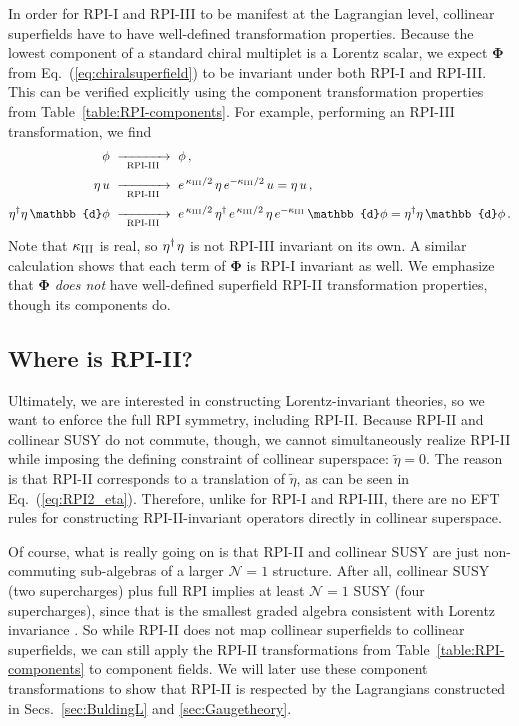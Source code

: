 \documentclass[12pt,document,nofootinbib,superscriptaddress,onecolumn,preprintnumbers,balancelastpage]{article}
\newcommand{\s}{\hspace{0.8pt}}
\newcommand{\PP}{\mathbb{d}}
\newcommand{\RPIiii}{\,\,\xrightarrow[\hspace{5pt}\text{RPI-III}\hspace{5pt}]{}\,\,}
\DeclareRobustCommand{\Secs}[2]{Secs.~\ref{#1} and \ref{#2}}
\DeclareRobustCommand{\Tab}[1]{Table~\ref{#1}}
\DeclareRobustCommand{\Eq}[1]{Eq.~(\ref{#1})}
\newcommand{\bPhi}{\boldsymbol{\Phi}}
\begin{document}
\begin{spacing}{1.2}
In order for RPI-I and RPI-III to be manifest at the Lagrangian level, collinear superfields have to have well-defined transformation properties.
%
Because the lowest component of a standard chiral multiplet is a Lorentz scalar, we expect $\boldsymbol{\Phi}$ from \Eq{eq:chiralsuperfield} to be invariant under both RPI-I and RPI-III.
%
This can be verified explicitly using the component transformation properties from \Tab{table:RPI-components}.
%
For example, performing an RPI-III transformation, we find
\begin{align}
\phi &\RPIiii  \phi \, , \nonumber\\[2pt]
\eta \, u &\RPIiii  e^{\,\kappa_{\rm III}/2}\, \eta\,  e^{-\kappa_{\rm III}/2}\, u = \eta \, u \, ,\nonumber\\[2pt]
\eta^\dagger \eta \, \PP \phi &\RPIiii  e^{\,\kappa_{\rm III}/2}\,\eta^\dagger\, e^{\,\kappa_{\rm III}/2} \, \eta \, e^{- \kappa_{\rm III}}\, \PP \phi = \eta^\dagger \eta \, \PP \phi\,.
\end{align}
Note that $\kappa_{\rm III}$ is real, so $\eta^\dagger\s \eta$ is not RPI-III invariant on its own.
%
A similar calculation shows that each term of $\bPhi$ is RPI-I invariant as well.
%
We emphasize that $\bPhi$ \emph{does not} have well-defined superfield RPI-II transformation properties, though its components do.

\subsection{Where is RPI-II?}
\label{subsec:RPIii}
%

Ultimately, we are interested in constructing Lorentz-invariant theories, so we want to enforce the full RPI symmetry, including RPI-II.
%
Because RPI-II and collinear SUSY do not commute, though, we cannot simultaneously realize RPI-II while imposing the defining constraint of collinear superspace:  $\tilde{\eta} = 0$.
%
The reason is that RPI-II corresponds to a translation of $\tilde{\eta}$, as can be seen in \Eq{eq:RPI2_eta}.
%
Therefore, unlike for RPI-I and RPI-III, there are no EFT rules for constructing RPI-II-invariant operators directly in collinear superspace. 


Of course, what is really going on is that RPI-II and collinear SUSY are just non-commuting sub-algebras of a larger $\mathcal{N} = 1$ structure.
%
After all, collinear SUSY (two supercharges) plus full RPI implies at least $\mathcal{N} = 1$ SUSY (four supercharges), since that is the smallest graded algebra consistent with Lorentz invariance \cite{Haag:1974qh}.
%
So while RPI-II does not map collinear superfields to collinear superfields, we can still apply the RPI-II transformations from \Tab{table:RPI-components} to component fields.
%
We will later use these component transformations to show that RPI-II is respected by the Lagrangians constructed in \Secs{sec:BuldingL}{sec:Gaugetheory}.


\end{spacing}
\end{document}
